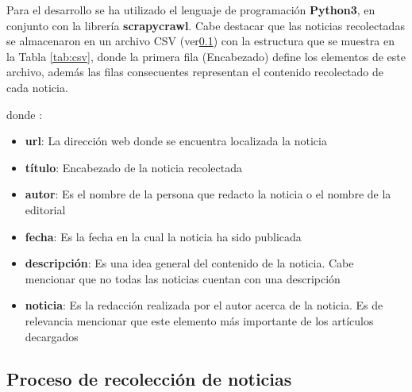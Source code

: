 Para el desarrollo se ha utilizado el lenguaje de programación \textbf{Python3}, en conjunto con la librería \textbf{scrapycrawl}. Cabe destacar que las noticias recolectadas se almacenaron en un archivo CSV (ver\ref{}) con la estructura que se muestra en la Tabla \ref{tab:csv}, donde la primera fila (Encabezado) define los elementos de este archivo, además las filas consecuentes representan el contenido recolectado de cada noticia.\\

\begin{table}[H]
\centering
{}
\caption{Ejemplo de estructura de un archivo CSV}
\label{tab:csv}
\end{table}

donde :
\begin{itemize}
	\item \textbf{url}: La dirección web donde se encuentra localizada la noticia 
	\item \textbf{título}: Encabezado de la noticia recolectada
	\item \textbf{autor}: Es el nombre de la persona que redacto la noticia o el nombre de la editorial
	\item \textbf{fecha}: Es la fecha en la cual la noticia ha sido publicada
	\item \textbf{descripción}: Es una idea general del contenido de la noticia. Cabe mencionar que no todas las noticias cuentan con una descripción
	\item \textbf{noticia}: Es la redacción realizada por el autor acerca de la noticia. Es de relevancia mencionar que este elemento más importante de los artículos decargados 
\end{itemize}

\subsection{Proceso de recolección de noticias}


